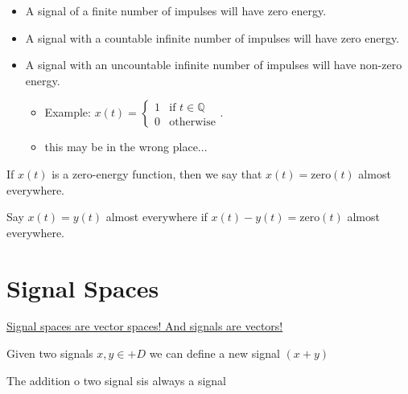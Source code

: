 \begin{remark}
    \begin{itemize}
        \item A signal of a finite number of impulses will have zero energy.
        \item A signal with a countable infinite number of impulses will have zero energy.
        \item A signal with an uncountable infinite number of impulses will have non-zero energy.
              \begin{itemize}
                  \item Example: $x(t) = \begin{cases}
                                1 & \text{if } t \in \mathbb{Q} \\
                                0 & \text{otherwise}
                            \end{cases}$.
                  \item this may be in the wrong place...
              \end{itemize}
    \end{itemize}
\end{remark}

\begin{vocabulary}
    If $x(t)$ is a zero-energy function, then we say that $x(t) = \text{zero}(t)$ almost everywhere.
\end{vocabulary}

\begin{vocabulary}
    Say $x(t) = y(t)$ almost everywhere if $x(t) - y(t) = \text{zero}(t)$ almost everywhere.
\end{vocabulary}

\section{Signal Spaces}
\begin{remark}
    \underline{Signal spaces are vector spaces! And signals are vectors!}
\end{remark}

\begin{definition}
    Given two signals $x, y \in \mathbb+
    {D}$ we can define a new signal $(x+y)$\end{definition}

\begin{remark}
    The addition o two signal sis always a signal
\end{remark}

\section{}